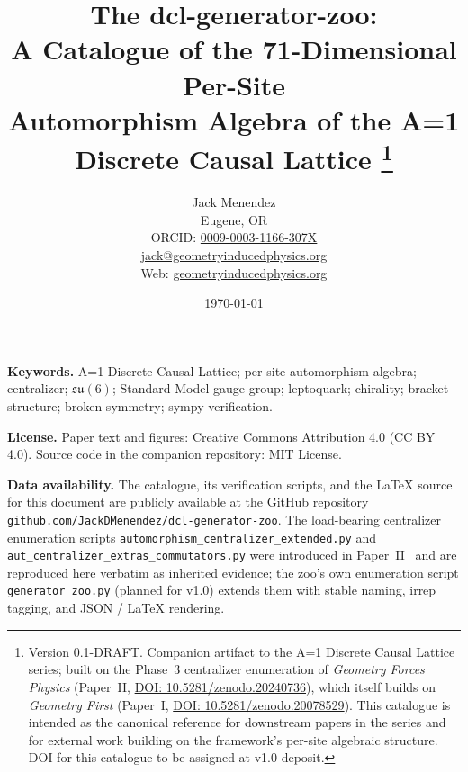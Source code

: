 \documentclass[12pt, letterpaper]{article}
\title{The dcl-generator-zoo:\\
       A Catalogue of the 71-Dimensional Per-Site\\
       Automorphism Algebra of the A=1 Discrete Causal Lattice%
       \thanks{Version 0.1-DRAFT.  Companion artifact to the A=1
       Discrete Causal Lattice series; built on the Phase~3
       centralizer enumeration of
       \emph{Geometry Forces Physics} (Paper~II,
       \href{https://doi.org/10.5281/zenodo.20240736}{DOI:
       10.5281/zenodo.20240736}), which itself builds on
       \emph{Geometry First} (Paper~I,
       \href{https://doi.org/10.5281/zenodo.20078529}{DOI:
       10.5281/zenodo.20078529}).  This catalogue is intended as
       the canonical reference for downstream papers in the series
       and for external work building on the framework's per-site
       algebraic structure.  DOI for this catalogue to be assigned
       at v1.0 deposit.}}
\author{Jack Menendez\\
        \small Eugene, OR\\
        \small ORCID: \href{https://orcid.org/0009-0003-1166-307X}{0009-0003-1166-307X}\\
        \small \href{mailto:jack@geometryinducedphysics.org}{jack@geometryinducedphysics.org}\\
        \small Web: \href{https://geometryinducedphysics.org/}{geometryinducedphysics.org}}
\date{\today}
\begin{document}
\maketitle

\begin{abstract}
    
\end{abstract}


\medskip
\noindent\textbf{Keywords.}  A=1 Discrete Causal Lattice; per-site
automorphism algebra; centralizer; $\mathfrak{su}(6)$; Standard
Model gauge group; leptoquark; chirality; bracket structure; broken
symmetry; sympy verification.

\medskip
\noindent\textbf{License.}  Paper text and figures: Creative Commons
Attribution 4.0 (CC BY 4.0).  Source code in the companion
repository: MIT License.

\medskip
\noindent\textbf{Data availability.}  The catalogue, its
verification scripts, and the \LaTeX{} source for this document are
publicly available at the GitHub repository
\nolinkurl{github.com/JackDMenendez/dcl-generator-zoo}.  The
load-bearing centralizer enumeration scripts
\nolinkurl{automorphism_centralizer_extended.py} and
\nolinkurl{aut_centralizer_extras_commutators.py} were introduced
in Paper~II~\cite{menendez2026sm} and are reproduced here verbatim
as inherited evidence; the zoo's own enumeration script
\nolinkurl{generator_zoo.py} (planned for v1.0) extends them with
stable naming, irrep tagging, and JSON / \LaTeX{} rendering.



\newpage
\tableofcontents
\newpage

\end{document}
